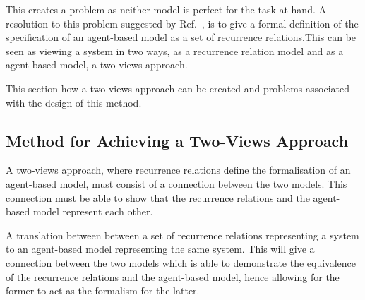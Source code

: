 \documentclass{article}
\begin{document}
This creates a problem as neither model is perfect for the task at hand. A resolution to this problem suggested by Ref.~\cite{econmistsnoabm}, is to give a formal definition of the specification of an agent-based model as a set of recurrence relations.This can be seen as viewing a system in two ways, as a recurrence relation model and as a agent-based model, a two-views approach.

This section how a two-views approach can be created and problems associated with the design of this method. 

\subsection{Method for Achieving a Two-Views Approach}
A two-views approach, where recurrence relations define the formalisation of an agent-based model, must consist of a connection between the two models. This connection must be able to show that the recurrence relations and the agent-based model represent each other.  


A translation between between a set of recurrence relations representing a system to an agent-based model representing the same system. This will give a connection between the two models which is able to demonstrate the equivalence of the recurrence relations and the agent-based model, hence allowing for the former to act as the formalism for the latter.   
\end{document}
